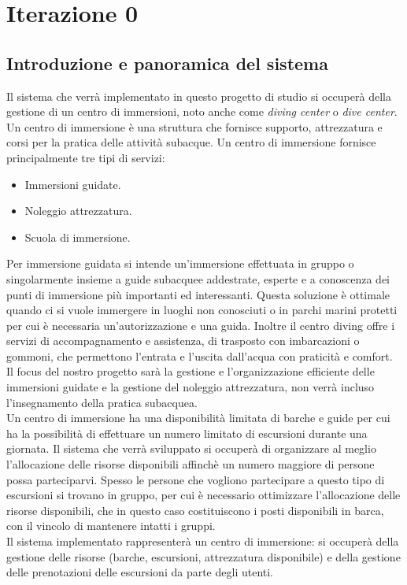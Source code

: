 \chapter{Iterazione 0}
\section{Introduzione e panoramica del sistema}
Il sistema che verrà implementato in questo progetto di studio si occuperà della gestione di un centro di immersioni, noto anche come \emph{diving center} o \emph{dive center}. Un centro di immersione è una struttura che fornisce supporto, attrezzatura e corsi per la pratica delle attività subacque. Un centro di immersione fornisce principalmente tre tipi di servizi:
\begin{itemize}
    \item Immersioni guidate.
    \item Noleggio attrezzatura.
    \item Scuola di immersione.
\end{itemize}
Per immersione guidata si intende un'immersione effettuata in gruppo o singolarmente insieme a guide subacquee addestrate, esperte e a conoscenza dei punti di immersione più importanti ed interessanti. Questa soluzione è ottimale quando ci si vuole immergere in luoghi non conosciuti o in parchi marini protetti per cui è necessaria un'autorizzazione e una guida. Inoltre il centro diving offre i servizi di accompagnamento e assistenza, di trasposto con imbarcazioni o gommoni, che permettono l'entrata e l'uscita dall'acqua con praticità e comfort.
\\
Il focus del nostro progetto sarà la gestione e l'organizzazione efficiente delle immersioni guidate e la gestione del noleggio attrezzatura, non verrà incluso l'insegnamento della pratica subacquea.
\\
Un centro di immersione ha una disponibilità limitata di barche e guide per cui ha la possibilità di effettuare un numero limitato di escursioni durante una giornata. Il sistema che verrà sviluppato si occuperà di organizzare al meglio l'allocazione delle risorse disponibili affinchè un numero maggiore di persone possa parteciparvi. Spesso le persone che vogliono partecipare a questo tipo di escursioni si trovano in gruppo, per cui è necessario ottimizzare l'allocazione delle risorse disponibili, che in questo caso costituiscono i posti disponibili in barca, con il vincolo di mantenere intatti i gruppi.
\\
Il sistema implementato rappresenterà un centro di immersione: si occuperà della gestione delle risorse (barche, escursioni, attrezzatura disponibile) e della gestione delle prenotazioni delle escursioni da parte degli utenti.
